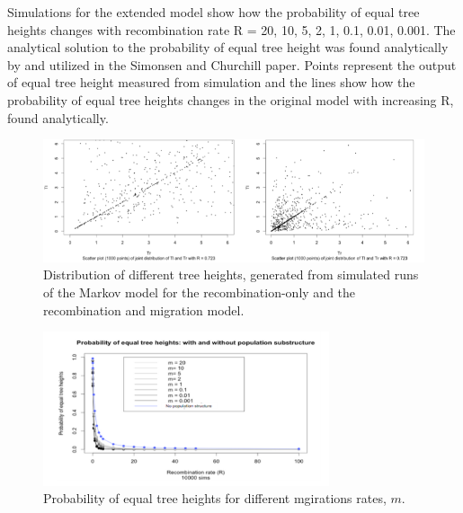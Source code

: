 \documentclass[11pt,oneside]{amsart}
\begin{document}
Simulations for the extended model show how the probability of equal tree heights changes with recombination rate R = 20, 10, 5, 2, 1, 0.1, 0.01, 0.001. The analytical solution to the probability of equal tree height was found analytically by \cite{Griffiths1981} and utilized in the Simonsen and Churchill paper. Points represent the output of equal tree height measured from simulation and the lines show how the probability of equal tree heights changes in the original model with increasing R, found analytically.  

\begin{figure}[ht]
\centering
\includegraphics[width=1.0\textwidth]{Dst_height.png}
\caption{Distribution of different tree heights, generated from simulated runs of the Markov model for the recombination-only and the recombination and migration model.}
\label{Figure: n = 3 lumped recomb}
\end{figure}

\begin{figure}[ht]
\centering
\includegraphics[width=0.75\textwidth]{Pequal_height.png}
\caption{Probability of equal tree heights for different mgirations rates, $m$.}
\label{pequal height}
\end{figure}
\end{document}
